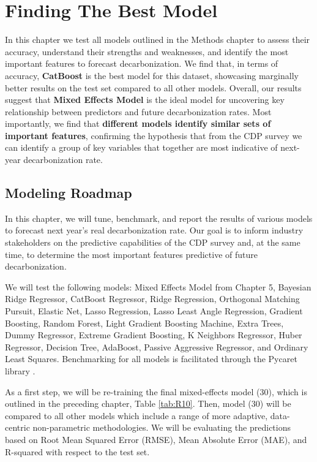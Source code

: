 \chapter{Finding The Best Model}
\label{ch:finding-the-best-model}

\begin{keytakeaway}
    In this chapter we test all models outlined in the Methods chapter to assess their accuracy, understand their strengths and weaknesses, and identify the most important features to forecast decarbonization. We find that, in terms of accuracy, \textbf{CatBoost} is the best model for this dataset, showcasing marginally better results on the test set compared to all other models. Overall, our results suggest that \textbf{Mixed Effects Model} is the ideal model for uncovering key relationship between predictors and future decarbonization rates. Most importantly, we find that \textbf{different models identify similar sets of important features}, confirming the hypothesis that from the CDP survey we can identify a group of key variables that together are most indicative of next-year decarbonization rate.
\end{keytakeaway}



\section{Modeling Roadmap}
In this chapter, we will tune, benchmark, and report the results of various models to forecast next year's real decarbonization rate. Our goal is to inform industry stakeholders on the predictive capabilities of the CDP survey and, at the same time, to determine the most important features predictive of future decarbonization.

We will test the following models: Mixed Effects Model from Chapter 5, Bayesian Ridge Regressor, CatBoost Regressor, Ridge Regression, Orthogonal Matching Pursuit, Elastic Net, Lasso Regression, Lasso Least Angle Regression, Gradient Boosting, Random Forest, Light Gradient Boosting Machine, Extra Trees, Dummy Regressor, Extreme Gradient Boosting, K Neighbors Regressor, Huber Regressor, Decision Tree, AdaBoost, Passive Aggressive Regressor, and Ordinary Least Squares. Benchmarking for all models is facilitated through the Pycaret library \cite{pycaret}. 

As a first step, we will be re-training the final mixed-effects model (30), which is outlined in the preceding chapter, Table \ref{tab:R10}. Then, model (30) will be compared to all other models which include a range of more adaptive, data-centric non-parametric methodologies. We will be evaluating the predictions based on Root Mean Squared Error (RMSE), Mean Absolute Error (MAE), and R-squared \cite{gmd} with respect to the test set. 

